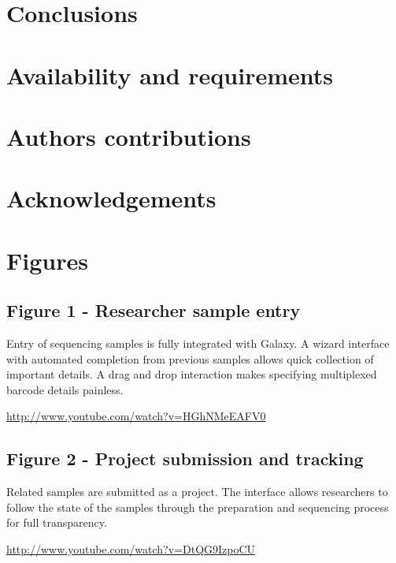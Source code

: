 \documentclass[10pt]{bmc_article}
\newenvironment{bmcformat}{\begin{raggedright}\baselineskip20pt\sloppy\setboolean{publ}{false}}{\end{raggedright}\baselineskip20pt\sloppy}
\begin{document}
\begin{bmcformat}
\section*{Conclusions}

\section*{Availability and requirements}

\section*{Authors contributions}

\section*{Acknowledgements}

{
   }  %


\section*{Figures}
\subsection*{Figure 1 - Researcher sample entry}
Entry of sequencing samples is fully integrated with Galaxy. A
wizard interface with automated completion from previous samples
allows quick collection of important details. A drag and drop
interaction makes specifying multiplexed barcode details painless.

\url{http://www.youtube.com/watch?v=HGhNMeEAFV0}

\subsection*{Figure 2 - Project submission and tracking}
Related samples are submitted as a project. The interface allows
researchers to follow the state of the samples through the
preparation and sequencing process for full transparency.

\url{http://www.youtube.com/watch?v=DtQG9IzpoCU}


\end{bmcformat}
\end{document}
